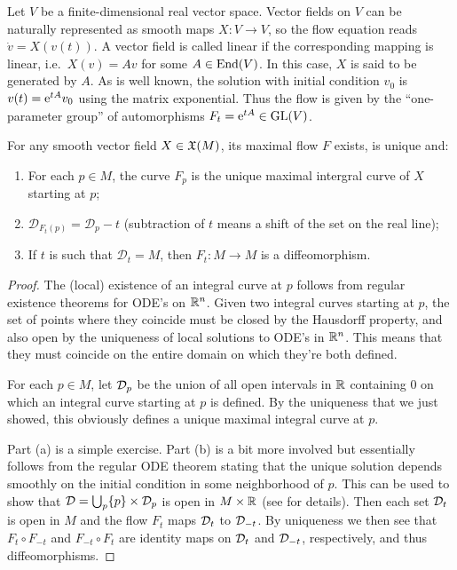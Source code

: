 \begin{example}
    Let $V$ be a finite-dimensional real vector space.  Vector fields on $V$ can be naturally represented as smooth maps $X:V\to V$, so the flow equation reads $\dot v=X(v(t))$. A vector field is called linear if the corresponding mapping is linear, i.e.~$X(v)=Av$ for some $A\in\operatorname{End}(V)$. In this case, $X$ is said to be generated by $A$. As is well known, the solution with initial condition $v_0$ is $v(t)=\mathrm{e}^{tA}v_0$ using the matrix exponential. Thus the flow is given by the ``one-parameter group'' of automorphisms $F_t=\mathrm{e}^{tA}\in \operatorname{GL}(V)$.
\end{example}

\begin{thm}
    For any smooth vector field $X\in\mathfrak{X}(M)$, its maximal flow $F$ exists, is unique and:
    \begin{enumerate}
        \item For each $p\in M$, the curve $F_p$ is the unique maximal intergral curve of $X$ starting at $p$;
        \item $\mathcal{D}_{F_t(p)}=\mathcal{D}_p-t$ (subtraction of $t$ means a shift of the set on the real line);
        \item If $t$ is such that $\mathcal{D}_t=M$, then $F_t:M\to M$ is a diffeomorphism.
    \end{enumerate}
\end{thm}
\begin{proof}
The (local) existence of an integral curve at $p$ follows from regular existence theorems for ODE's on $\mathbb{R}^n$. Given two integral curves starting at $p$, the set of points where they coincide must be closed by the Hausdorff property, and also open by the uniqueness of local solutions to ODE's in $\mathbb{R}^n$. This means that they must coincide on the entire domain on which they're both defined.

For each $p\in M$, let $\mathcal{D}_p$ be the union of all open intervals in $\mathbb{R}$ containing $0$ on which an integral curve starting at $p$ is defined. By the uniqueness that we just showed, this obviously defines a unique maximal integral curve at $p$.

Part (a) is a simple exercise. Part (b) is a bit more involved but essentially follows from the regular ODE theorem stating that the unique solution depends smoothly on the initial condition in some neighborhood of $p$. This can be used to show that $\mathcal{D}=\bigcup_p \{p\}\times \mathcal{D}_p$ is open in $M\times\mathbb{R}$ (see \cite[Thm.~9.12]{Lee} for details). Then each set $\mathcal{D}_t$ is open in $M$ and the flow $F_t$ maps $\mathcal{D}_t$ to $\mathcal{D}_{-t}$. By uniqueness we then see that $F_t\circ F_{-t}$ and $F_{-t}\circ F_t$ are identity maps on $\mathcal{D}_t$ and $\mathcal{D}_{-t}$, respectively, and thus diffeomorphisms.
\end{proof}



